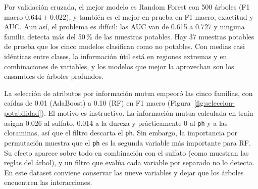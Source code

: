 Por validación cruzada, el mejor modelo es Random Forest con 500 árboles (F1 macro
$0.644\pm0.022$), y también es el mejor en prueba en F1 macro, exactitud y AUC. Aun
así, el problema es difícil: las AUC van de 0.615 a 0.727 y ninguna familia detecta
más del 50\,\% de las muestras potables. Hay 37 muestras potables de prueba que los
cinco modelos clasifican como no potables. Con medias casi idénticas entre clases, la
información útil está en regiones extremas y en combinaciones de variables, y los
modelos que mejor la aprovechan son los ensambles de árboles profundos.

La selección de atributos por información mutua empeoró las cinco familias, con caídas
de 0.01 (AdaBoost) a 0.10 (RF) en F1 macro (Figura~\ref{fig:seleccion-potabilidad}). El motivo es
instructivo. La información mutua calculada en train asigna 0.026 al sulfato, 0.014 a
la dureza y prácticamente 0 al \texttt{ph} y a las cloraminas, así que el filtro
descarta el \texttt{ph}. Sin embargo, la importancia por permutación muestra que el
\texttt{ph} es la segunda variable más importante para RF. Su efecto aparece sobre todo
en combinación con el sulfato (como muestran las reglas del árbol), y un filtro que
evalúa cada variable por separado no lo detecta. En este dataset conviene conservar
las nueve variables y dejar que los árboles encuentren las interacciones.

